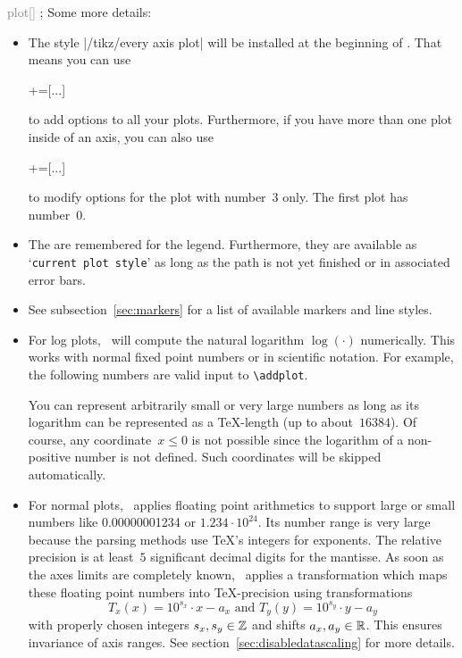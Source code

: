 \begin{command}{ \textcolor{gray}{plot[]}  ;}
\noindent
Some more details:
\begin{itemize}
	\item The style |/tikz/every axis plot| will be installed at the beginning of . That means you can use
	\begin{codeexample}
	+=[...]
	\end{codeexample}
	to add options to all your plots. Furthermore, if you have more than one plot inside of an axis, you can also use
	\begin{codeexample}
	+=[...]
	\end{codeexample}
	to modify options for the plot with number~$3$ only. The first plot has number~$0$.
	\item The  are remembered for the legend. Furthermore, they are available as `\texttt{current plot style}' as long as the path is not yet finished or in associated error bars.
	\item See subsection~\ref{sec:markers} for a list of available markers and line styles.
	\item For log plots, \PGFPlots\ will compute the natural logarithm $\log(\cdot)$ numerically. This works with normal fixed point numbers or in scientific notation. For example, the following numbers are valid input to \lstinline!\addplot!.
\begin{codeexample}[]
\end{codeexample}
	You can represent arbitrarily small or very large numbers as long as its logarithm can be represented as a \TeX-length (up to about~$16384$). Of course, any coordinate~$x\le 0$ is not possible since the logarithm of a non-positive number is not defined. Such coordinates will be skipped automatically.

	\item For normal plots, \PGFPlots\ applies floating point arithmetics to support large or small numbers like 0.00000001234 or $1.234\cdot 10^{24}$. Its number range is very large because the parsing methods use \TeX's integers for exponents. The relative precision is at least~$5$ significant decimal digits for the mantisse. As soon as the axes limits are completely known, \PGFPlots\ applies a transformation which maps these floating point numbers into \TeX-precision using transformations
		\[ T_x(x) = 10^{s_x} \cdot x - a_x \text{ and } T_y(y) = 10^{s_y} \cdot y - a_y \]
	with properly chosen integers $s_x, s_y \in \mathbb{Z}$ and shifts $a_x,a_y\in \mathbb{R}$. This ensures invariance of axis ranges. See section~\ref{sec:disabledatascaling} for more details.


\end{itemize}
\end{command}
